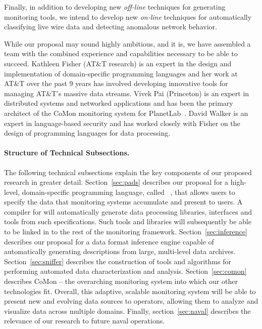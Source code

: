 Finally, in addition to developing new {\em off-line} techniques for
generating monitoring tools, we intend to develop new {\em on-line}
techniques for automatically classifying live wire data and
detecting anomalous network behavior.

While our proposal may sound highly ambitious, and it is, we have
assembled a team with the combined experience and capabilities
necessary to be able to succeed.  Kathleen Fisher (AT\&T research) 
is an expert in the design and implementation of domain-specific
programming languages and her work at AT\&T over the past 9 years
has involved developing innovative tools for managing AT\&T's
massive data streams.  Vivek Pai (Princeton) is an expert in distributed
systems and networked applications
and has been the primary architect of the CoMon monitoring system
for PlanetLab~\cite{planetlab}.  David Walker is an expert in language-based security
and has worked closely with Fisher on the design of programming languages
for data processing. 

\paragraph*{Structure of Technical Subsections.}
The following technical subsections explain the key components of
our proposed research in greater detail.    
Section~\ref{sec:pads} describes our proposal for a high-level, 
domain-specific programming language, called
\pads{}~\cite{fisher+:pads,fisher+:popl06,mandelbaum+:pads-ml}, that
allows users to specify the data that monitoring systems 
accumulate and present to users.  A compiler for \pads{} will
automatically generate data processing libraries, interfaces and tools
from such specifications.  Such tools and libraries will subsequently 
be able to be linked in to the
rest of the monitoring framework.   
Section~\ref{sec:inference} describes our proposal for a 
data format inference engine capable
of automatically generating \pads{} descriptions from
large, multi-level data archives.   Section~\ref{sec:sniffer}
describes the construction of tools and algorithms for 
performing automated data characterization and analysis.
Section~\ref{sec:comon}
describes CoMon -- the overarching monitoring system into which our other 
technologies fit.  Overall, this adaptive, scalable monitoring system will 
be able to present new and evolving data sources to operators, allowing them to
analyze and visualize data across multiple domains.  Finally, 
section~\ref{sec:naval} describes the relevance of our research to future
naval operations.


